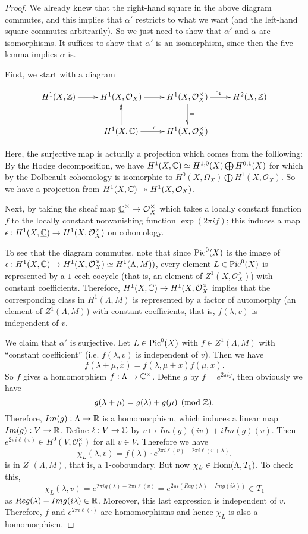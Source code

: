 \begin{proof}
We already knew that the right-hand square in the above diagram commutes, and this implies that $\alpha'$ restricts to what we want (and the left-hand square commutes arbitrarily). So we just need to show that $\alpha'$ and $\alpha$ are isomorphisms. It suffices to show that $\alpha'$ is an isomorphism, since then the five-lemma implies $\alpha$ is. 

First, we start with a diagram

\[
\xymatrix{
H^1(X,\ZZ) \ar[r] &H^1(X,\mathcal{O}_X) \ar[r] &H^1(X,\mathcal{O}_X^\times) \ar[d]^= \ar[r]^{c_1} &H^2(X,\ZZ)\\
&H^1(X,\CC) \ar@{->>}[u] \ar[r]^\epsilon &H^1(X,\mathcal{O}_X^\times)}
\]



Here, the surjective map is actually a projection which comes from the folllowing: By the Hodge decomposition, we have $H^1(X,{\mathbb C})\simeq H^{1,0}(X)\bigoplus H^{0,1}(X)$ for which by the Dolbeault cohomology is isomorphic to $H^0(X,\Omega_X)\bigoplus H^1(X,\mathcal{O}_X)$. So we have a projection from $H^1(X,{\mathbb C})\twoheadrightarrow H^1(X,\mathcal{O}_X)$. 

Next, by taking the sheaf map $\underline{{\mathbb C}}^\times \to \mathcal{O}_X^\times$ which takes a locally constant function $f$ to the locally constant nonvanishing function $\exp(2\pi if)$; this induces a map $\epsilon: H^1(X,\underline{{\mathbb C}})\to H^1(X,\mathcal{O}_X^\times)$ on cohomology. 

To see that the diagram commutes, note that since $\operatorname{Pic}^0(X)$ is the image of $\epsilon: H^1(X,{\mathbb C})\to H^1(X,\mathcal{O}_X^\times) \simeq H^1(\Lambda,M))$, every element $L\in \operatorname{Pic}^0(X)$ is represented by a $1$-cech cocycle (that is, an element of $Z^1(X,\mathcal{O}_X^\times)$) with constant coefficients. Therefore, $H^1(X,{\mathbb C})\to H^1(X,\mathcal{O}_X^\times$ implies that the corresponding class in $H^1(\Lambda,M)$ is represented by a factor of automorphy (an element of $Z^1(\Lambda,M)$) with constant coefficients, that is, $f(\lambda,v)$ is independent of $v$. 

We claim that $\alpha'$ is surjective. Let $L\in \operatorname{Pic}^0(X)$ with $f\in Z^1(\Lambda,M)$ with ``constant coefficient'' (i.e. $f(\lambda,v)$ is independent of $v$). Then we have
$$f(\lambda+\mu,\tilde{x})=f(\lambda,\mu+\tilde{x})f(\mu,\tilde{x}).$$
So $f$ gives a homomorphism $f:\Lambda\to {\mathbb C}^\times$. Define $g$ by $f=e^{2\pi i g}$, then obviously we have
$$g(\lambda+\mu)=g(\lambda)+g(\mu) \pmod{{\mathbb Z}}.$$
Therefore, $Im(g):\Lambda\to {\mathbb R}$ is a homomorphism, which induces a linear map $Im(g):V\to {\mathbb R}$. Define $\ell: V\to {\mathbb C}$ by $v\mapsto Im(g)(iv)+iIm(g)(v)$. Then $e^{2\pi i \ell(v)}\in H^0(V,\mathcal{O}_V^\times)$ for all $v\in V$. Therefore we have 
$$\chi_L(\lambda,v)=f(\lambda) \cdot e^{2\pi i \ell(v)-2\pi i \ell(v+\lambda)}.$$
is in $Z^1(\Lambda,M)$, that is, a $1$-coboundary. But now $\chi_L\in \operatorname{Hom}(\Lambda,T_1)$. To check this, 
$$\chi_L(\lambda,v)=e^{2\pi i g(\lambda)-2\pi i \ell(v)}=e^{2\pi i (Re g(\lambda)-Im g(i\lambda))}\in T_1$$
as $Re g(\lambda)-Im g(i\lambda)\in {\mathbb R}$. Moreover, this last expression is independent of $v$. Therefore, $f$ and $e^{2\pi i \ell(\cdot)}$ are homomorphisms and hence $\chi_L$ is also a homomorphism.


\end{proof}
